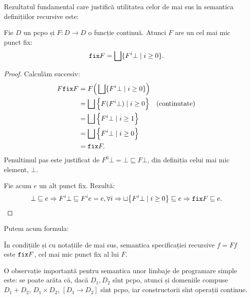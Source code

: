 Rezultatul fundamental care justifică utilitatea celor de mai sus în semantica definițiilor
recursive este:

\begin{theorem}\label{thm:fix}
  Fie $ D $ un pcpo și $ F : D \to D $ o funcție continuă. Atunci $ F $ are un cel mai
  mic punct fix:
  \[
    \texttt{fix} F = \bigsqcup \{ F^i \bot \mid i \geq 0 \}.
  \]
\end{theorem}

\begin{proof}
  Calculăm succesiv:
  \begin{align*}
    F \texttt{fix} F &= F \Big( \bigsqcup \{ F^i \bot \mid i \geq 0 \} \Big) \\
                   &= \bigsqcup \Big\{ F(F^i \bot) \mid i \geq 0 \Big\} \quad \text{(continutate)} \\
                   &= \bigsqcup \Big\{ F^i \bot \mid i \geq 1 \Big\} \\
                   &= \bigsqcup \Big\{ F^i \bot \mid i \geq 0 \Big\} \\
                   &= \texttt{fix} F.
  \end{align*}
  Penultimul pas este justificat de $ F^0 \bot = \bot \sqsubseteq F \bot $, din definiția celui
  mai mic element, $ \bot $.

  Fie acum $ e $ un alt punct fix. Rezultă:
  \[
    \bot \sqsubseteq e \Rightarrow F^i \bot \sqsubseteq F^i e = e, \forall i \Rightarrow %
    \sqcup \big\{ F^i \bot \mid i \geq 0 \big\} \sqsubseteq e \Rightarrow \code{fix} F \sqsubseteq e.
  \]
\end{proof}

Putem acum formula:

\begin{definition}\label{def:semfix}
  În condițiile și cu notațiile de mai sus, semantica specificației recursive $ f = Ff $
  este $ \texttt{fix} F $, cel mai mic punct fix al lui $ F $.
\end{definition}

O observație importantă pentru semantica unor limbaje de programare simple este:
se poate arăta că, dacă $ D_1, D_2 $ sînt pcpo, atunci și domeniile compuse $ D_1 + D_2 $,
$ D_1 \times D_2 $, $ [D_1 \to D_2] $ sînt pcpo, iar constructorii sînt operații continue.

